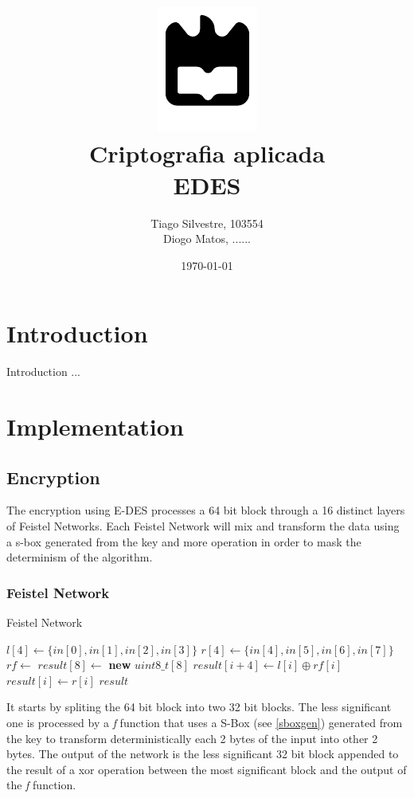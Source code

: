 \documentclass{article} %
\title{%
    \includegraphics[width=0.3\linewidth]{./assets/logo.pdf}\\[20pt]
    \Huge \bfseries Criptografia aplicada \\[10pt]
    \Large EDES
}
\author{Tiago Silvestre, 103554 \\ Diogo Matos, ......}
\date{\today}
\begin{document}
\maketitle

\newpage

\tableofcontents

\clearpage

\section{Introduction}
Introduction ...

\section{Implementation}

\subsection{Encryption}
The encryption using E-DES processes a 64 bit block through a 16 distinct layers of Feistel Networks. 
Each Feistel Network will mix and transform the data using a s-box generated from the key and more
operation in order to mask the determinism of the algorithm.

\subsubsection{Feistel Network}

\begin{algorithm}[H]
  \caption{Feistel Network}
  \begin{algorithmic}[1]

  \State $l[4] \gets \{in[0], in[1], in[2], in[3]\}$
  \State $r[4] \gets \{in[4], in[5], in[6], in[7]\}$
  \State $rf \gets$ 
  \State $result[8] \gets$ \textbf{new} $uint8\_t[8]$
    \State $result[i + 4] \gets l[i] \oplus rf[i]$
    \State $result[i] \gets r[i]$
  \EndFor
  \State \Return $result$
  \end{algorithmic}
\end{algorithm}

It starts by spliting the 64 bit block into two 32 bit blocks.
The less significant one is processed by a \textit{f} function that uses a S-Box (see \autoref{sboxgen}) 
generated from the key to transform deterministically each 2 bytes of the input into other 2 bytes.
The output of the network is the less significant 32 bit block appended to the result of a xor operation between 
the most significant block and the output of the \textit{f} function.
\end{document}
